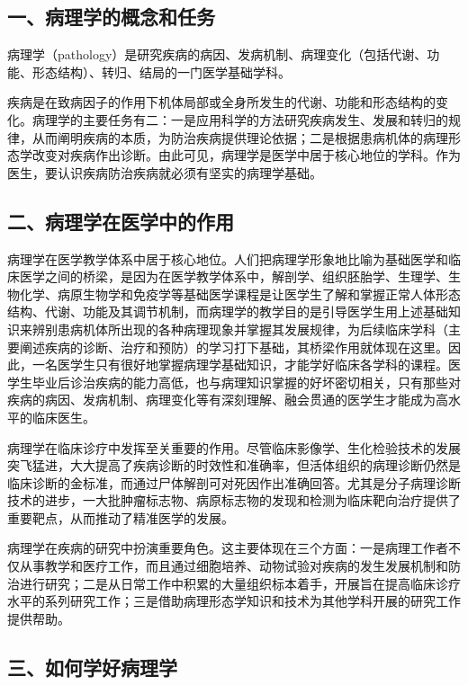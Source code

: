 
\subsection*{一、病理学的概念和任务}

病理学（pathology）是研究疾病的病因、发病机制、病理变化（包括代谢、功能、形态结构）、转归、结局的一门医学基础学科。

疾病是在致病因子的作用下机体局部或全身所发生的代谢、功能和形态结构的变化。病理学的主要任务有二：一是应用科学的方法研究疾病发生、发展和转归的规律，从而阐明疾病的本质，为防治疾病提供理论依据；二是根据患病机体的病理形态学改变对疾病作出诊断。由此可见，病理学是医学中居于核心地位的学科。作为医生，要认识疾病防治疾病就必须有坚实的病理学基础。

\subsection*{二、病理学在医学中的作用}

病理学在医学教学体系中居于核心地位。人们把病理学形象地比喻为基础医学和临床医学之间的桥梁，是因为在医学教学体系中，解剖学、组织胚胎学、生理学、生物化学、病原生物学和免疫学等基础医学课程是让医学生了解和掌握正常人体形态结构、代谢、功能及其调节机制，而病理学的教学目的是引导医学生用上述基础知识来辨别患病机体所出现的各种病理现象并掌握其发展规律，为后续临床学科（主要阐述疾病的诊断、治疗和预防）的学习打下基础，其桥梁作用就体现在这里。因此，一名医学生只有很好地掌握病理学基础知识，才能学好临床各学科的课程。医学生毕业后诊治疾病的能力高低，也与病理知识掌握的好坏密切相关，只有那些对疾病的病因、发病机制、病理变化等有深刻理解、融会贯通的医学生才能成为高水平的临床医生。

病理学在临床诊疗中发挥至关重要的作用。尽管临床影像学、生化检验技术的发展突飞猛进，大大提高了疾病诊断的时效性和准确率，但活体组织的病理诊断仍然是临床诊断的金标准，而通过尸体解剖可对死因作出准确回答。尤其是分子病理诊断技术的进步，一大批肿瘤标志物、病原标志物的发现和检测为临床靶向治疗提供了重要靶点，从而推动了精准医学的发展。

病理学在疾病的研究中扮演重要角色。这主要体现在三个方面：一是病理工作者不仅从事教学和医疗工作，而且通过细胞培养、动物试验对疾病的发生发展机制和防治进行研究；二是从日常工作中积累的大量组织标本着手，开展旨在提高临床诊疗水平的系列研究工作；三是借助病理形态学知识和技术为其他学科开展的研究工作提供帮助。

\subsection*{三、如何学好病理学}

